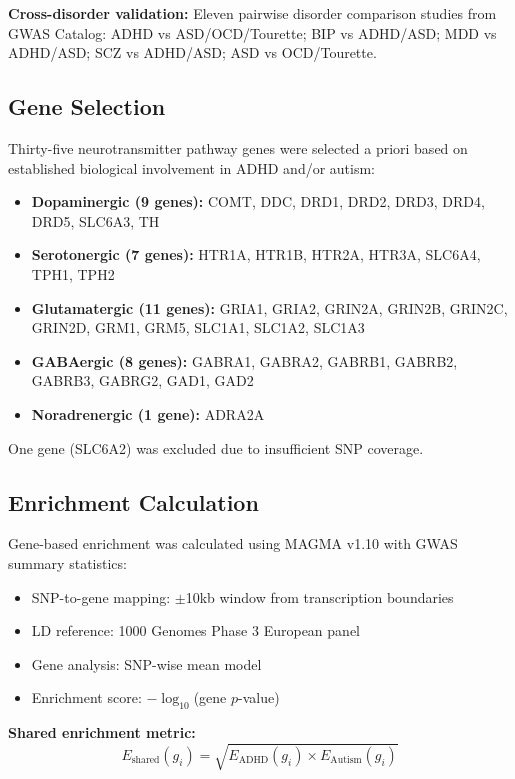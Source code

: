 \documentclass[12pt,letterpaper]{article}
\theoremstyle{definition}
\theoremstyle{remark}
\begin{document}
\textbf{Cross-disorder validation:} Eleven pairwise disorder comparison studies from GWAS Catalog\cite{buniello2019}: ADHD vs ASD/OCD/Tourette; BIP vs ADHD/ASD; MDD vs ADHD/ASD; SCZ vs ADHD/ASD; ASD vs OCD/Tourette.

\subsection{Gene Selection}

Thirty-five neurotransmitter pathway genes were selected a priori based on established biological involvement in ADHD and/or autism:
\begin{itemize}
    \item \textbf{Dopaminergic (9 genes):} COMT, DDC, DRD1, DRD2, DRD3, DRD4, DRD5, SLC6A3, TH
    \item \textbf{Serotonergic (7 genes):} HTR1A, HTR1B, HTR2A, HTR3A, SLC6A4, TPH1, TPH2
    \item \textbf{Glutamatergic (11 genes):} GRIA1, GRIA2, GRIN2A, GRIN2B, GRIN2C, GRIN2D, GRM1, GRM5, SLC1A1, SLC1A2, SLC1A3
    \item \textbf{GABAergic (8 genes):} GABRA1, GABRA2, GABRB1, GABRB2, GABRB3, GABRG2, GAD1, GAD2
\item \textbf{Noradrenergic (1 gene):} ADRA2A
\end{itemize}

One gene (SLC6A2) was excluded due to insufficient SNP coverage.

\subsection{Enrichment Calculation}

Gene-based enrichment was calculated using MAGMA v1.10\cite{deleeuw2015} with GWAS summary statistics:
\begin{itemize}
    \item SNP-to-gene mapping: $\pm$10kb window from transcription boundaries
    \item LD reference: 1000 Genomes Phase 3 European panel
    \item Gene analysis: SNP-wise mean model
    \item Enrichment score: $-\log_{10}$(gene $p$-value)
\end{itemize}

\textbf{Shared enrichment metric:}
\begin{equation}
E_{\text{shared}}(g_i) = \sqrt{E_{\text{ADHD}}(g_i) \times E_{\text{Autism}}(g_i)}
\end{equation}
\end{document}
